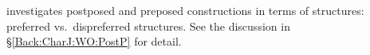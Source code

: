  investigates postposed and preposed constructions
in terms of  structures:
preferred vs.~dispreferred structures.
See the discussion in \S \ref{Back:CharJ:WO:PostP} for detail.
%
%

